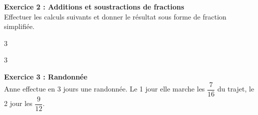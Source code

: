 \documentclass[12pt,a4paper]{exam}
\begin{document}
\textbf{Exercice 2 : Additions et soustractions de fractions}
\vspace{5pt}\\
Effectuer les calculs suivants et donner le résultat sous forme de fraction simplifiée.

\vspace{0.3cm}

\begin{multicols}{3}
\end{multicols}

\begin{multicols}{3}
\end{multicols}

\textbf{Exercice 3 : Randonnée}
\vspace{5pt}\\
Anne effectue en 3 jours une randonnée. Le 1 jour elle marche les $\dfrac{7}{16}$ du 
trajet, le 2 jour les $\dfrac{9}{12}$.
\end{document}

